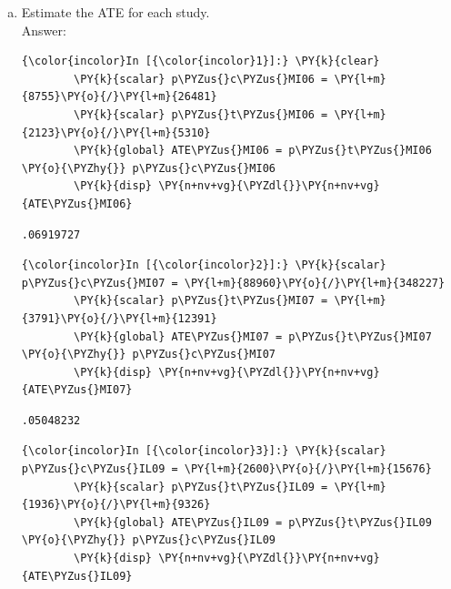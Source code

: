 \documentclass[11pt,notitlepage]{article}\usepackage[]{graphicx}\usepackage[]{color}
\makeatletter
\newenvironment{kframe}{%
 \def\at@end@of@kframe{}%
 \ifinner\ifhmode%
  \def\at@end@of@kframe{\end{minipage}}%
  \begin{minipage}{\columnwidth}%
 \fi\fi%
 \def\FrameCommand##1{\hskip\@totalleftmargin \hskip-\fboxsep
 \colorbox{shadecolor}{##1}\hskip-\fboxsep
     \hskip-\linewidth \hskip-\@totalleftmargin \hskip\columnwidth}%
 \MakeFramed {\advance\hsize-\width
   \@totalleftmargin\z@ \linewidth\hsize
   \@setminipage}}%
 {\par\unskip\endMakeFramed%
 \at@end@of@kframe}
\newenvironment{knitrout}{}{} %
\makeatother
\begin{document}
\begin{enumerate}[a)]
\item Estimate the ATE for each study.\\
Answer:\\

\begin{knitrout}
\color{fgcolor}\begin{kframe}
    \begin{Verbatim}[commandchars=\\\{\}]
{\color{incolor}In [{\color{incolor}1}]:} \PY{k}{clear}
        \PY{k}{scalar} p\PYZus{}c\PYZus{}MI06 = \PY{l+m}{8755}\PY{o}{/}\PY{l+m}{26481}
        \PY{k}{scalar} p\PYZus{}t\PYZus{}MI06 = \PY{l+m}{2123}\PY{o}{/}\PY{l+m}{5310}
        \PY{k}{global} ATE\PYZus{}MI06 = p\PYZus{}t\PYZus{}MI06 \PY{o}{\PYZhy{}} p\PYZus{}c\PYZus{}MI06
        \PY{k}{disp} \PY{n+nv+vg}{\PYZdl{}}\PY{n+nv+vg}{ATE\PYZus{}MI06}
\end{Verbatim}

    \begin{Verbatim}[commandchars=\\\{\}]
.06919727

    \end{Verbatim}

    \begin{Verbatim}[commandchars=\\\{\}]
{\color{incolor}In [{\color{incolor}2}]:} \PY{k}{scalar} p\PYZus{}c\PYZus{}MI07 = \PY{l+m}{88960}\PY{o}{/}\PY{l+m}{348227}
        \PY{k}{scalar} p\PYZus{}t\PYZus{}MI07 = \PY{l+m}{3791}\PY{o}{/}\PY{l+m}{12391}
        \PY{k}{global} ATE\PYZus{}MI07 = p\PYZus{}t\PYZus{}MI07 \PY{o}{\PYZhy{}} p\PYZus{}c\PYZus{}MI07
        \PY{k}{disp} \PY{n+nv+vg}{\PYZdl{}}\PY{n+nv+vg}{ATE\PYZus{}MI07}
\end{Verbatim}

    \begin{Verbatim}[commandchars=\\\{\}]
.05048232

    \end{Verbatim}

    \begin{Verbatim}[commandchars=\\\{\}]
{\color{incolor}In [{\color{incolor}3}]:} \PY{k}{scalar} p\PYZus{}c\PYZus{}IL09 = \PY{l+m}{2600}\PY{o}{/}\PY{l+m}{15676}
        \PY{k}{scalar} p\PYZus{}t\PYZus{}IL09 = \PY{l+m}{1936}\PY{o}{/}\PY{l+m}{9326}
        \PY{k}{global} ATE\PYZus{}IL09 = p\PYZus{}t\PYZus{}IL09 \PY{o}{\PYZhy{}} p\PYZus{}c\PYZus{}IL09
        \PY{k}{disp} \PY{n+nv+vg}{\PYZdl{}}\PY{n+nv+vg}{ATE\PYZus{}IL09}
\end{Verbatim}


\end{kframe}
\end{knitrout}
\end{enumerate}
\end{document}
